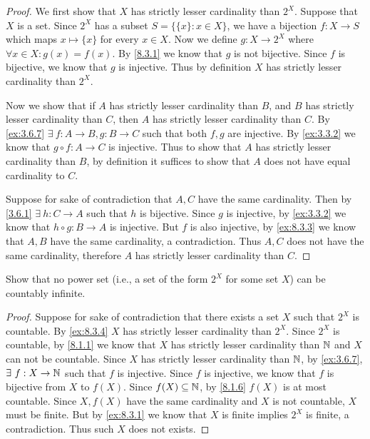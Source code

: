 \begin{proof}
  We first show that \(X\) has strictly lesser cardinality than \(2^X\).
  Suppose that \(X\) is a set.
  Since \(2^X\) has a subset \(S = \{\{x\} : x \in X\}\), we have a bijection \(f : X \to S\) which maps \(x \mapsto \{x\}\) for every \(x \in X\).
  Now we define \(g : X \to 2^X\) where \(\forall x \in X : g(x) = f(x)\).
  By \cref{8.3.1} we know that \(g\) is not bijective.
  Since \(f\) is bijective, we know that \(g\) is injective.
  Thus by definition \(X\) has strictly lesser cardinality than \(2^X\).

  Now we show that if \(A\) has strictly lesser cardinality than \(B\), and \(B\) has strictly lesser cardinality than \(C\), then \(A\) has strictly lesser cardinality than \(C\).
  By \cref{ex:3.6.7} \(\exists\ f : A \to B, g : B \to C\) such that both \(f, g\) are injective.
  By \cref{ex:3.3.2} we know that \(g \circ f : A \to C\) is injective.
  Thus to show that \(A\) has strictly lesser cardinality than \(B\), by definition it suffices to show that \(A\) does not have equal cardinality to \(C\).

  Suppose for sake of contradiction that \(A, C\) have the same cardinality.
  Then by \cref{3.6.1} \(\exists\ h : C \to A\) such that \(h\) is bijective.
  Since \(g\) is injective, by \cref{ex:3.3.2} we know that \(h \circ g : B \to A\) is injective.
  But \(f\) is also injective, by \cref{ex:8.3.3} we know that \(A, B\) have the same cardinality, a contradiction.
  Thus \(A, C\) does not have the same cardinality, therefore \(A\) has strictly lesser cardinality than \(C\).
\end{proof}

\begin{ex}\label{ex:8.3.5}
  Show that no power set (i.e., a set of the form \(2^X\) for some set \(X\)) can be countably infinite.
\end{ex}

\begin{proof}
  Suppose for sake of contradiction that there exists a set \(X\) such that \(2^X\) is countable.
  By \cref{ex:8.3.4} \(X\) has strictly lesser cardinality than \(2^X\).
  Since \(2^X\) is countable, by \cref{8.1.1} we know that \(X\) has strictly lesser cardinality than \(\mathbb{N}\) and \(X\) can not be countable.
  Since \(X\) has strictly lesser cardinality than \(\mathbb{N}\), by \cref{ex:3.6.7}, \(\exists\ f : X \to \mathbb{N}\) such that \(f\) is injective.
  Since \(f\) is injective, we know that \(f\) is bijective from \(X\) to \(f(X)\).
  Since \(f(X) \subseteq \mathbb{N}\), by \cref{8.1.6} \(f(X)\) is at most countable.
  Since \(X, f(X)\) have the same cardinality and \(X\) is not countable, \(X\) must be finite.
  But by \cref{ex:8.3.1} we know that \(X\) is finite implies \(2^X\) is finite, a contradiction.
  Thus such \(X\) does not exists.
\end{proof}